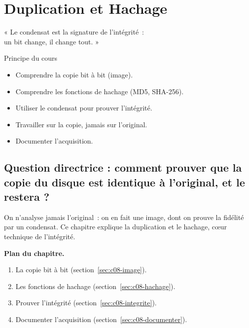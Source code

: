 
\chapter{Duplication et Hachage}
\label{chap:duplication}

\epigraph{%
    « Le condensat est la signature de l'intégrité~:\\
    un bit change, il change tout. »%
}{Principe du cours}


\begin{boxobjectifs}
\begin{itemize}
    \item Comprendre la copie bit à bit (image).
    \item Comprendre les fonctions de hachage (MD5, SHA-256).
    \item Utiliser le condensat pour prouver l'intégrité.
    \item Travailler sur la copie, jamais sur l'original.
    \item Documenter l'acquisition.
\end{itemize}
\end{boxobjectifs}

\bigskip

\section*{Question directrice : comment prouver que la copie du disque est identique à l'original, et le restera ?}

On n'analyse jamais l'original~: on en fait une image, dont on prouve la
fidélité par un condensat. Ce chapitre explique la duplication et le hachage,
cœur technique de l'intégrité.

\medskip
\textbf{Plan du chapitre.}
\begin{enumerate}
    \item La copie bit à bit (section~\ref{sec:c08-image}).
    \item Les fonctions de hachage (section~\ref{sec:c08-hachage}).
    \item Prouver l'intégrité (section~\ref{sec:c08-integrite}).
    \item Documenter l'acquisition (section~\ref{sec:c08-documenter}).
\end{enumerate}

